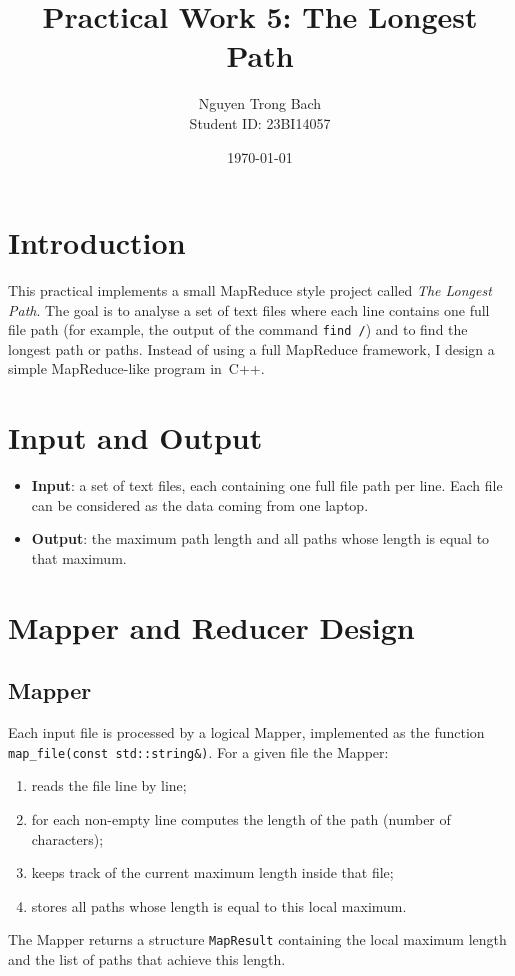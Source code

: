 \documentclass[a4paper,11pt]{article}
\title{Practical Work 5: The Longest Path}
\author{Nguyen Trong Bach \\ Student ID: 23BI14057}
\date{\today}
\begin{document}
\maketitle

\section{Introduction}
This practical implements a small MapReduce style project called
\emph{The Longest Path}. The goal is to analyse a set of text files
where each line contains one full file path (for example, the output
of the command \texttt{find /}) and to find the longest path or paths.
Instead of using a full MapReduce framework, I design a simple
MapReduce-like program in~C++.

\section{Input and Output}
\begin{itemize}
  \item \textbf{Input}: a set of text files, each containing one full
  file path per line. Each file can be considered as the data coming
  from one laptop.
  \item \textbf{Output}: the maximum path length and all paths whose
  length is equal to that maximum.
\end{itemize}

\section{Mapper and Reducer Design}

\subsection*{Mapper}
Each input file is processed by a logical Mapper, implemented as the
function \texttt{map\_file(const std::string\&)}. For a given file the
Mapper:
\begin{enumerate}
  \item reads the file line by line;
  \item for each non-empty line computes the length of the path
  (number of characters);
  \item keeps track of the current maximum length inside that file;
  \item stores all paths whose length is equal to this local maximum.
\end{enumerate}
The Mapper returns a structure \texttt{MapResult} containing the local
maximum length and the list of paths that achieve this length.
\end{document}
